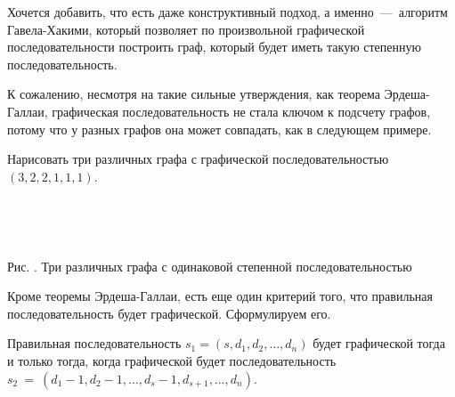 	Хочется добавить, что есть даже конструктивный подход, а именно~---~алгоритм Гавела-Хакими, который позволяет по 
	произвольной графической последовательности построить граф, который будет иметь такую степенную последовательность.

	К сожалению, несмотря на такие сильные утверждения, как теорема Эрдеша-Галлаи, графическая последовательность не стала 
	ключом к подсчету графов, потому что у разных графов она может совпадать, как в следующем примере.
	
\begin{example}
	Нарисовать три различных графа с графической последовательностью $(3, 2, 2, 1, 1, 1)$.
	
\begin{center}
\;\ \;\ \;\ \;\ \;\ \;\ \;\ \;\ \;\ \;\ 
\;\ \;\ \;\ \;\ \;\ \;\ \;\ \;\ \;\ \;\ 
\newline
\newline
	\small Рис. \images. Три различных графа с одинаковой степенной последовательностью
\end{center}
\end{example}

Кроме теоремы Эрдеша-Галлаи, есть еще один критерий того, что правильная последовательность будет графической. Сформулируем его.

\begin{statement}
	Правильная последовательность $s_1 = (s, d_1, d_2, \dots, d_n)$ будет графической тогда и только тогда, 
	когда графической будет последовательность $s_2~=~(d_1 - 1, d_2 - 1, \dots, d_s - 1, d_{s+1}, \dots, d_n)$.
\end{statement}


